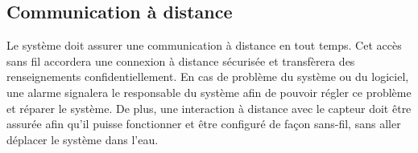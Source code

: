 

\subsection{Communication à distance}
\label{s:beo_bes_commdist}

Le système doit assurer une communication à distance en tout temps.
Cet accès sans fil accordera une connexion à distance sécurisée et transfèrera des renseignements confidentiellement.
En cas de problème du système ou du logiciel, une alarme signalera le responsable du système afin de pouvoir régler ce problème et réparer le système.
De plus, une interaction à distance avec le capteur doit être assurée afin qu’il puisse fonctionner et être configuré de façon sans-fil, sans aller déplacer le système dans l’eau.